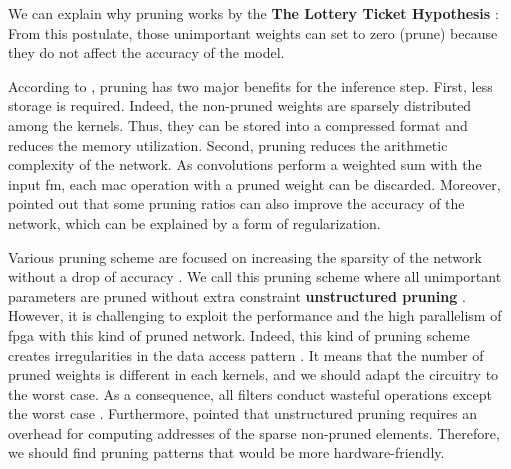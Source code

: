We can explain why pruning works by the \textbf{The Lottery Ticket Hypothesis} \cite{frankle_lottery_2018, frankle_early_2020}:  From this postulate, those unimportant weights can set to zero (prune) because they do not affect the accuracy of the model.

According to \textcite{cheng_recent_2018}, pruning has two major benefits for the inference step. First, less storage is required. Indeed, the non-pruned weights are sparsely distributed among the kernels. Thus, they can be stored into a compressed format and reduces the memory utilization. Second, pruning reduces the arithmetic complexity of the network. As convolutions perform a weighted sum with the input \acrshort{fm}, each \acrfull{mac} operation with a pruned weight can be discarded. Moreover, \textcite{han_learning_2015, mao_exploring_2017, kang_accelerator-aware_2020} pointed out that some pruning ratios can also improve the accuracy of the network, which can be explained by a form of regularization.

Various pruning scheme are focused on increasing the sparsity of the network without a drop of accuracy \cite{han_learning_2015, han_deep_2016}.  We call this pruning scheme where all unimportant parameters are pruned without extra constraint \textbf{unstructured pruning} \cite{cheng_recent_2018}. However, it is challenging to exploit the performance and the high parallelism of \acrshort{fpga} with this kind of pruned network. Indeed, this kind of pruning scheme creates irregularities in the data access pattern \cite{zhu_efficient_2020}. It means that the number of pruned weights is different in each kernels, and we should adapt the circuitry to the worst case. As a consequence, all filters conduct wasteful operations except the worst case \cite{shimoda_filter-wise_2019}. Furthermore, \textcite{anwar_structured_2017} pointed that unstructured pruning requires an overhead for computing addresses of the sparse non-pruned elements. Therefore, we should find pruning patterns that would be more hardware-friendly.

